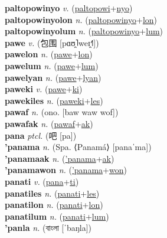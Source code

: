\textbf{paltopowinyo} \textit{v.} (\hyperref[paltopowi]{paltopowi}+\hyperref[nyo]{nyo})
 \label{paltopowinyo} \\
\textbf{paltopowinyolon} \textit{n.} (\hyperref[paltopowinyo]{paltopowinyo}+\hyperref[lon]{lon})
 \label{paltopowinyolon} \\
\textbf{paltopowinyolum} \textit{n.} (\hyperref[paltopowinyo]{paltopowinyo}+\hyperref[lum]{lum})
 \label{paltopowinyolum} \\
\textbf{pawe} \textit{v.} ({\chinese{}包围} [pɑʊ̯˥weɪ̯˧˥])
 \label{pawe} \\
\textbf{pawelon} \textit{n.} (\hyperref[pawe]{pawe}+\hyperref[lon]{lon})
 \label{pawelon} \\
\textbf{pawelum} \textit{n.} (\hyperref[pawe]{pawe}+\hyperref[lum]{lum})
 \label{pawelum} \\
\textbf{pawelyan} \textit{n.} (\hyperref[pawe]{pawe}+\hyperref[lyan]{lyan})
 \label{pawelyan} \\
\textbf{paweki} \textit{v.} (\hyperref[pawe]{pawe}+\hyperref[ki]{ki})
 \label{paweki} \\
\textbf{pawekiles} \textit{n.} (\hyperref[paweki]{paweki}+\hyperref[les]{les})
 \label{pawekiles} \\
\textbf{pawaf} \textit{n.} (ono. [baw waw wof])
 \label{pawaf} \\
\textbf{pawafak} \textit{n.} (\hyperref[pawaf]{pawaf}+\hyperref[ak]{ak})
 \label{pawafak} \\
\textbf{pana} \textit{ptcl.} ({\chinese{}吧} [pa])
 \label{pana} \\
\textbf{'panama} \textit{n.} (Spa. ⟨Panamá⟩ [panaˈma])
 \label{'panama} \\
\textbf{'panamaak} \textit{n.} (\hyperref['panama]{'panama}+\hyperref[ak]{ak})
 \label{'panamaak} \\
\textbf{'panamawon} \textit{n.} (\hyperref['panama]{'panama}+\hyperref[won]{won})
 \label{'panamawon} \\
\textbf{panati} \textit{v.} (\hyperref[pana]{pana}+\hyperref[ti]{ti})
 \label{panati} \\
\textbf{panatiles} \textit{n.} (\hyperref[panati]{panati}+\hyperref[les]{les})
 \label{panatiles} \\
\textbf{panatilon} \textit{n.} (\hyperref[panati]{panati}+\hyperref[lon]{lon})
 \label{panatilon} \\
\textbf{panatilum} \textit{n.} (\hyperref[panati]{panati}+\hyperref[lum]{lum})
 \label{panatilum} \\
\textbf{'panla} \textit{n.} ({\bengali{}বাংলা} [ˈbaŋla])
